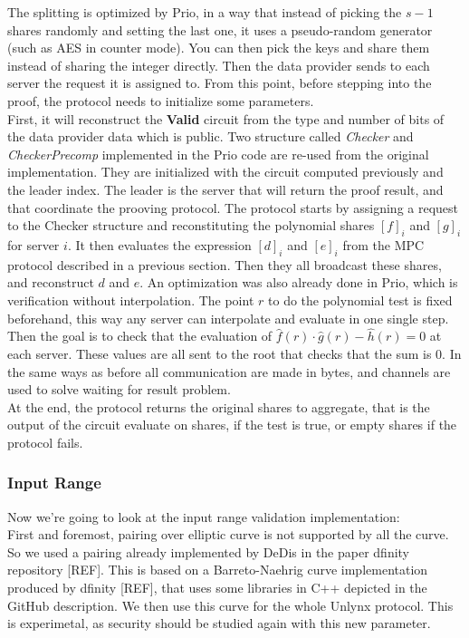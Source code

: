 \documentclass{article}
\begin{document}
The splitting is optimized by Prio, in a way that instead of picking the $s-1$ shares randomly and setting the last one, it uses a pseudo-random generator (such as AES in counter mode). You can then pick the keys and share them instead of sharing the integer directly.
Then the data provider sends to each server the request it is assigned to. From this point, before stepping into the proof, the protocol needs to initialize some parameters.\\

First, it will reconstruct the \textbf{Valid} circuit from the type and number of bits of the data provider data which is public.  Two structure called \textit{Checker} and \textit{CheckerPrecomp} implemented in the Prio code are re-used from the original implementation. They are initialized with the circuit computed previously and the leader index. The leader is the server that will return the proof result, and that coordinate the prooving protocol.
The protocol starts by assigning a request to the Checker structure and reconstituting the polynomial shares $[f]_i $ and $[g]_i$ for server $i$. It then evaluates the expression $[d]_i $ and $[e]_i$ from the MPC protocol described in a previous section. Then they all broadcast these shares, and reconstruct $d$ and $e$.
An optimization was also already done in Prio, which is verification without interpolation. The point $r$ to do the polynomial test is fixed beforehand, this way any server can interpolate and evaluate in one single step.\\
Then the goal is to check that the evaluation of $\hat{f}(r) \cdot \hat{g}(r) -\hat{h}(r) = 0$ at each server. These values are all sent to the root that checks that the sum is 0.
In the same ways as before all communication are made in bytes, and channels are used to solve waiting for result problem.\\
At the end, the protocol returns the original shares to aggregate, that is the output of the circuit evaluate on shares, if the test is true, or empty shares if the protocol fails.


\subsubsection*{Input Range}
Now we're going to look at the input range validation implementation:\\

First and foremost, pairing over elliptic curve is not supported by all the curve. So we used a pairing already implemented by DeDis in the paper dfinity repository [REF].  This is based on a Barreto-Naehrig curve implementation produced by dfinity [REF], that uses some libraries in C++ depicted in the GitHub description. We then use this curve for the whole Unlynx protocol. This is experimetal, as security should be studied again with this new parameter.\\
\end{document}
